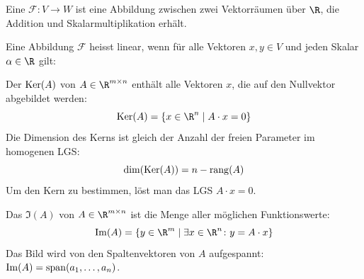 \ZSFNewColumn
{}

\begin{runintext}
Eine  $\mathcal{F} \colon V \to W$ ist eine Abbildung zwischen zwei Vektorräumen über $\R$, die Addition und Skalarmultiplikation erhält.
\end{runintext}


\begin{defbox}
Eine Abbildung $\mathcal{F}$ heisst linear, wenn für alle Vektoren $x, y \in V$ und jeden Skalar $\alpha \in \R$ gilt:
  \begin{ZSFlist}[][ordered]
  \end{ZSFlist}
\end{defbox}

\begin{runintext}
  \begin{ZSFlist}
  \end{ZSFlist}
\end{runintext}


\begin{defbox}
Der  $\operatorname{Ker}(A)$ von $A \in \R^{m \times n}$ enthält alle Vektoren $x$, die auf den Nullvektor abgebildet werden:
\[ \Ker(A) = \{x \in \R^n \mid A \cdot x = 0 \} \]
Die Dimension des Kerns ist gleich der Anzahl der freien Parameter im homogenen LGS:
\[ \dim(\operatorname{Ker}(A)) = n - \operatorname{rang}(A) \]
Um den Kern zu bestimmen, löst man das LGS $A \cdot x = 0$.
\end{defbox}

\begin{defbox}
Das  $\Im(A)$ von $A \in \R^{m \times n}$ ist die Menge aller möglichen Funktionswerte:
\[ \Im(A) = \{y \in \R^m \mid \exists x \in \R^n \colon y = A \cdot x \} \]
Das Bild wird von den Spaltenvektoren von $A$ aufgespannt: $\operatorname{Im}(A) = \operatorname{span}(a_1, \dots, a_n)$. 
\end{defbox}

